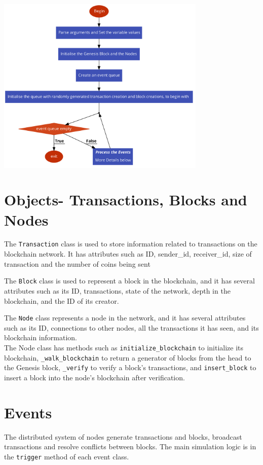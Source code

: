 \documentclass[a4paper,14pt]{article}
\begin{document}
\includegraphics[width=10cm]{CodeFlow.png}

\section{Objects- Transactions, Blocks and Nodes}

The \verb|Transaction| class is used to store information related to transactions on the blockchain network. It has attributes such as ID, sender\_id, receiver\_id, size of transaction and the number of coins being sent

The \verb|Block| class is used to represent a block in the blockchain, and it has several attributes such as its ID, transactions, state of the network, depth in the blockchain, and the ID of its creator.

The \verb|Node| class represents a node in the network, and it has several attributes such as its ID, connections to other nodes, all the transactions it has seen, and its blockchain information. \\
The Node class has methods such as \verb|initialize_blockchain| to initialize its blockchain, \verb|_walk_blockchain| to return a generator of blocks from the head to the Genesis block, \verb|_verify| to verify a block's transactions, and \verb|insert_block| to insert a block into the node's blockchain after verification.

\section{Events}

The distributed system of nodes generate transactions and blocks, broadcast transactions and resolve conflicts between blocks. The main simulation logic is in the \verb|trigger| method of each event class.
\end{document}
